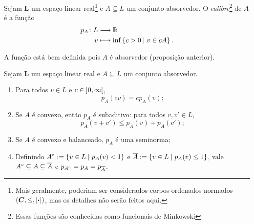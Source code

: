 \begin{definition}
Sejam $\bm L$ um espaço linear real\footnote{Mais geralmente, poderiam ser considerados corpos ordenados normados $(\bm C,\leq,\left\vert{\bm{\cdot}}\right\vert)$, mas os detalhes não serão feitos aqui.} e $A \subseteq L$ um conjunto absorvedor. O \emph{calibre}\footnote{Essas funções são conhecidas como funcionais de Minkowski} de $A$ é a função
	\begin{align*}
	{p_A}\colon {L} &\longrightarrow {\mathbb{R}} \\{v} &\longmapsto \inf\left\{ c>0 \;\middle\vert\; v \in cA \right\}.
	\end{align*}
\end{definition}

A função está bem definida pois $A$ é absorvedor (proposição anterior).

\begin{exercise}
Sejam $\bm L$ um espaço linear real e $A \subseteq L$ um conjunto absorvedor.
	\begin{enumerate}
	\item Para todos $v \in L$ e $c \in \left]0,\allowbreak \infty\right[$,
		\begin{equation*}
		p_A(cv) = c p_A(v);
		\end{equation*}
	\item Se $A$ é convexo, então $p_A$ é subaditivo: para todos $v,v' \in L$,
		\begin{equation*}
		p_A(v+v') \leq p_A(v) + p_{A}(v');
		\end{equation*}
	\item Se $A$ é convexo e balanceado, $p_A$ é uma seminorma;
	\item Definindo ${A}^\circ := \left\{ v \in L \;\middle\vert\; p_A(v) < 1 \right\}$ e $\overline{A} := \left\{ v \in L \;\middle\vert\; p_A(v) \leq 1 \right\}$, vale ${A}^\circ \subseteq A \subseteq \overline{A}$ e $p_{{A}^\circ} = p_{A} = p_{\overline{A}}$.
	\end{enumerate}
\end{exercise}








